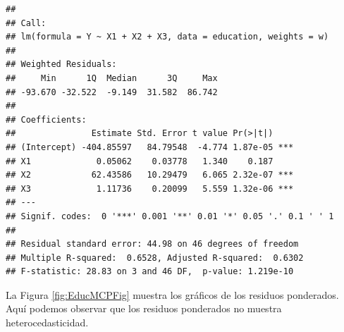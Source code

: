 \documentclass[
]{article}
\newenvironment{Shaded}{\begin{snugshade}}{\end{snugshade}}
\newcommand{\AttributeTok}[1]{\textcolor[rgb]{0.13,0.29,0.53}{#1}}
\newcommand{\DecValTok}[1]{\textcolor[rgb]{0.00,0.00,0.81}{#1}}
\newcommand{\FunctionTok}[1]{\textcolor[rgb]{0.13,0.29,0.53}{\textbf{#1}}}
\newcommand{\NormalTok}[1]{#1}
\newcommand{\OtherTok}[1]{\textcolor[rgb]{0.56,0.35,0.01}{#1}}
\newcommand{\SpecialCharTok}[1]{\textcolor[rgb]{0.81,0.36,0.00}{\textbf{#1}}}
\newcommand{\StringTok}[1]{\textcolor[rgb]{0.31,0.60,0.02}{#1}}
\begin{document}
\begin{verbatim}
## 
## Call:
## lm(formula = Y ~ X1 + X2 + X3, data = education, weights = w)
## 
## Weighted Residuals:
##     Min      1Q  Median      3Q     Max 
## -93.670 -32.522  -9.149  31.582  86.742 
## 
## Coefficients:
##               Estimate Std. Error t value Pr(>|t|)    
## (Intercept) -404.85597   84.79548  -4.774 1.87e-05 ***
## X1             0.05062    0.03778   1.340    0.187    
## X2            62.43586   10.29479   6.065 2.32e-07 ***
## X3             1.11736    0.20099   5.559 1.32e-06 ***
## ---
## Signif. codes:  0 '***' 0.001 '**' 0.01 '*' 0.05 '.' 0.1 ' ' 1
## 
## Residual standard error: 44.98 on 46 degrees of freedom
## Multiple R-squared:  0.6528, Adjusted R-squared:  0.6302 
## F-statistic: 28.83 on 3 and 46 DF,  p-value: 1.219e-10
\end{verbatim}

La Figura \ref{fig:EducMCPFig} muestra los gráficos de los residuos ponderados. Aquí podemos observar que los residuos ponderados no muestra heterocedasticidad.

\begin{Shaded}
\end{Shaded}
\end{document}
